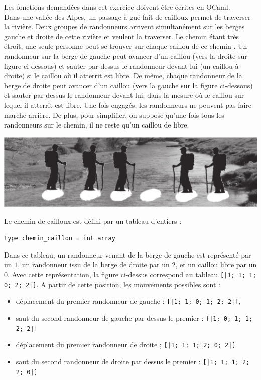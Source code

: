 \documentclass[11pt,a4paper]{article}
\begin{document}
\begin{Exercise}[title={Traversée de rivière}, origin={\bac {\sc ccinp 2023}}]
    
Les fonctions demandées dans cet exercice doivent être écrites en OCaml. \smallskip \\ 
Dans une vallée des Alpes, un passage à gué fait de cailloux permet de traverser la rivière. Deux groupes de randonneurs arrivent simultanément sur les berges gauche et droite de cette rivière et veulent la traverser. Le chemin étant très étroit, une seule personne peut se trouver sur chaque caillou de ce chemin . Un randonneur sur la berge de gauche peut avancer d’un caillou (vers la droite sur figure ci-dessous) et sauter par dessus le randonneur devant lui (un caillou à droite) si le caillou où il atterrit est libre. De même, chaque randonneur de la berge de droite peut avancer d’un caillou (vers la gauche sur la figure ci-dessous) et sauter par dessus le randonneur devant lui, dans la mesure où le caillou sur lequel il atterrit est libre. Une fois engagés, les randonneurs ne peuvent pas faire marche arrière. De plus, pour simplifier, on suppose qu’une fois tous les randonneurs sur le chemin, il ne reste qu’un caillou de libre.

  \begin{center}
    \includegraphics{randonneurs.eps}
  \end{center}


Le chemin de cailloux est défini par un tableau d'entiers :

\begin{center}
  \texttt{type chemin_caillou = int array}
\end{center}

Dans ce tableau, un randonneur venant de la berge de gauche est représenté par un $1$, un randonneur issu de la berge de droite par un $2$, et un caillou libre par un $0$. Avec cette représentation, la figure ci-dessus correspond au tableau {\tt [|1; 1; 1; 0; 2; 2|]}. A partir de cette position, les mouvements possibles sont :
\begin{itemize}
    \item déplacement du premier randonneur de gauche : {\tt [|1; 1; 0; 1; 2; 2|]},
    \item saut du second randonneur de gauche par dessus le premier : {\tt [|1; 0; 1; 1; 2; 2|]}
    \item déplacement du premier randonneur de droite ; {\tt [|1; 1; 1; 2; 0; 2|]}
    \item saut du second randonneur de droite par dessus le premier : {\tt [|1; 1; 1; 2; 2; 0|]}
\end{itemize}
\quad


\end{Exercise}
\end{document}
